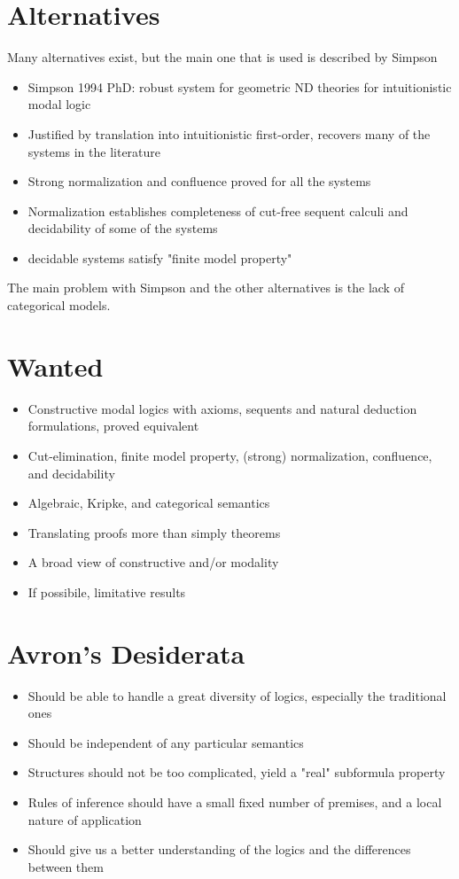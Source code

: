 \documentclass[11pt]{article}
\begin{document}
\section{Alternatives}
Many alternatives exist, but the main one that is used is described by Simpson \cite{Simpson1994ThePT}
\begin{itemize}
    \item Simpson 1994 PhD: robust system for geometric ND theories for intuitionistic modal logic
    \item Justified by translation into intuitionistic first-order, recovers many of the systems in the literature
    \item Strong normalization and confluence proved for all the systems
    \item Normalization establishes completeness of cut-free sequent calculi and decidability of some of the systems
    \item decidable systems satisfy "finite model property"
\end{itemize}
The main problem with Simpson and the other alternatives is the lack of categorical models.

\section{Wanted}

\begin{itemize}
    \item Constructive modal logics with axioms, sequents and natural deduction formulations, proved equivalent
    \item Cut-elimination, finite model property, (strong) normalization, confluence, and decidability
    \item Algebraic, Kripke, and categorical semantics
    \item Translating proofs more than simply theorems
    \item A broad view of constructive and/or modality
    \item If possibile, limitative results
\end{itemize}

\section{Avron's Desiderata}

\begin{itemize}
    \item Should be able to handle a great diversity of logics, especially the traditional ones
    \item Should be independent of any particular semantics
    \item Structures should not be too complicated, yield a "real" subformula property
    \item Rules of inference should have a small fixed number of premises, and a local nature of application
    \item Should give us a better understanding of the logics and the differences between them
\end{itemize}
\end{document}

